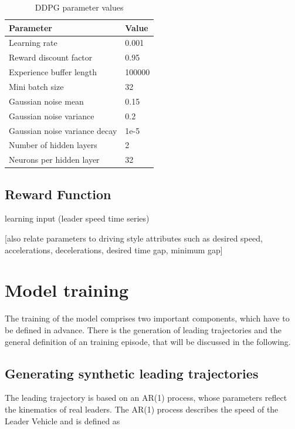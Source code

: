 \documentclass[review]{elsarticle}
\begin{document}
\begin{table}
	\caption{DDPG parameter values} 
	\label{tab:DDPGparameters} 
	\begin{center}
		\begin{tabular}{ p{} p{} }
			Parameter & Value \\ \hline
			Learning rate & 0.001 \\ 
			Reward discount factor & 0.95 \\ 
			Experience buffer length & 100000 \\ 
			Mini batch size & 32 \\ 			
			Gaussian noise mean & 0.15 \\ 
			Gaussian noise variance & 0.2 \\ 
			Gaussian noise variance decay  & 1e-5 \\ 
			Number of hidden layers & 2\\
			Neurons per hidden layer & 32\\
			

		\end{tabular}
	\end{center}
\end{table}


\subsection{Reward Function}

learning input (leader speed time series)

[also relate parameters to driving style attributes such as desired
speed, accelerations, decelerations, desired time gap, minimum gap]


\section{Model training}
The training of the model comprises two important components, which have to be defined in advance. There is the generation of leading trajectories and the general definition of an training episode, that will be discussed in the following.

\subsection{Generating synthetic leading trajectories}
The leading trajectory is based on an AR(1) process, whose parameters reflect the kinematics of real leaders. The AR(1) process describes the speed of the Leader Vehicle and is defined as 
\end{document}
